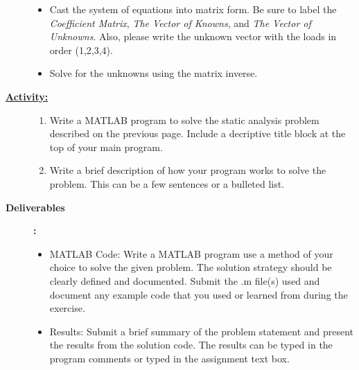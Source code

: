 \documentclass[12pt]{article}
\begin{document}
\begin{description}
\begin{itemize}
	\item Cast the system of equations into matrix form. Be sure to label the {\it Coefficient Matrix}, {\it The Vector of Knowns}, and {\it The Vector of Unknowns}. Also, please write the unknown vector with the loads in order (1,2,3,4).\vspace{10mm}
	
	
	\item Solve for the unknowns using the matrix inverse. 
	
	\end{itemize}


\item[\textbf{\underline{Activity:}}] \hfill \vspace{0mm}

\begin{enumerate}
	

	\item Write a MATLAB program to solve the static analysis problem described on the previous page. Include a decriptive title block at the top of your main program. 
	
	
	\item Write a brief description of how your program works to solve the problem. This can be a few sentences or a bulleted list.
	
	
\end{enumerate}

  \item [\textbf{ \large Deliverables}] \textbf{ \Large :}\\
    \begin{itemize} 
   
      \item MATLAB Code:
Write a MATLAB program use a method of your choice to solve the given problem. The solution strategy should be clearly defined and documented. Submit the .m file(s) used and document any example code that you used or learned from during the exercise.

      \item Results:
Submit a brief summary of the problem statement and present the results from the solution code. The results can be typed in the program comments or typed in the assignment text box.

    \end{itemize}



\end{description}
\end{document}
